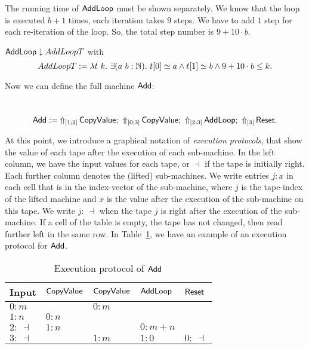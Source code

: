 The running time of $\MS{AddLoop}$ must be shown separately.  We know that the loop is executed $b+1$ times, each iteration takes $9$ steps.  We have to
add $1$ step for each re-iteration of the loop.  So, the total step number is $9+10 \cdot b$.
\begin{lemma}
  \label{lem:Add_Loop_TerminatesIn}
  $\MS{AddLoop} \downarrow AddLoopT$ with
  \[
    AddLoopT := \lambda t~k.~\exists (a~b:\Nat).~t[0] \simeq a \land t[1] \simeq b \land 9+10 \cdot b \leq k.
  \]
\end{lemma}

Now we can define the full machine $\MS{Add}$:
\begin{definition}[$\MS{Add}$][Add]
  \label{def:Add}
  ~
  \[
    \MS{Add} :=
    \LiftTapes{\MS{CopyValue}}{\Vector{1;2}} \Seq
    \LiftTapes{\MS{CopyValue}}{\Vector{0;3}} \Seq
    \LiftTapes{\MS{AddLoop}}{\Vector{2;3}} \Seq
    \LiftTapes{\MS{Reset}}{\Vector{3}}.
  \]
\end{definition}

At this point, we introduce a graphical notation of \emph{execution protocols}, that show the value of each tape after the execution of each
sub-machine.  In the left column, we have the input values for each tape, or $\dashv$ if the tape is initially right.  Each further column denotes the
(lifted) sub-machines.  We write entries $j: x$ in each cell that is in the index-vector of the sub-machine, where $j$ is the tape-index of the lifted
machine and $x$ is the value after the execution of the sub-machine on this tape.  We write $j:~\dashv$ when the tape $j$ is right after the execution
of the sub-machine.  If a cell of the table is empty, the tape has not changed, then read further left in the same row.  In Table~\ref{tab:exec-Add},
we have an example of an execution protocol for $\MS{Add}$.

\begin{table}[h]
  \centering
  \begin{tabular}{l||l|l|l|l}
    Input       & $\MS{CopyValue}$ & $\MS{CopyValue}$ & $\MS{AddLoop}$ & $\MS{Reset}$ \\ \hline
    $0: m$      &                  & $0 : m$          &                &              \\
    $1: n$      & $0 : n$          &                  &                &              \\
    $2:~\dashv$ & $1 : n$          &                  & $0: m+n$       &              \\
    $3:~\dashv$ &                  & $1 : m$          & $1: 0$         & $0:~ \dashv$ \\
  \end{tabular}
  \caption{Execution protocol of $\MS{Add}$}
  \label{tab:exec-Add}
\end{table}

